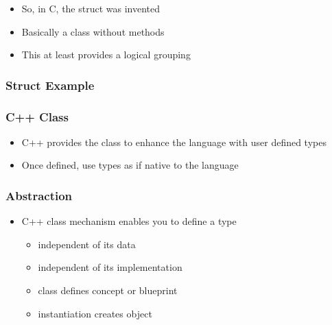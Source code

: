 \begin{itemize}
\itemsep1pt\parskip0pt
\item
  So, in C, the struct was invented
\item
  Basically a class without methods
\item
  This at least provides a logical grouping
\end{itemize}

\subsubsection{Struct Example}\label{struct-example}

\begin{Shaded}
\begin{Highlighting}[]

 
   
   
\NormalTok{\};}

  
\NormalTok{\{}
   \NormalTok{<}
\NormalTok{\}}
\end{Highlighting}
\end{Shaded}

\subsubsection{C++ Class}\label{c-class}

\begin{itemize}
\itemsep1pt\parskip0pt
\item
  C++ provides the class to enhance the language with user defined types
\item
  Once defined, use types as if native to the language
\end{itemize}

\subsubsection{Abstraction}\label{abstraction}

\begin{itemize}
\itemsep1pt\parskip0pt
\item
  C++ class mechanism enables you to define a type

  \begin{itemize}
  \itemsep1pt\parskip0pt
  \item
    independent of its data
  \item
    independent of its implementation
  \item
    class defines concept or blueprint
  \item
    instantiation creates object
  \end{itemize}
\end{itemize}

